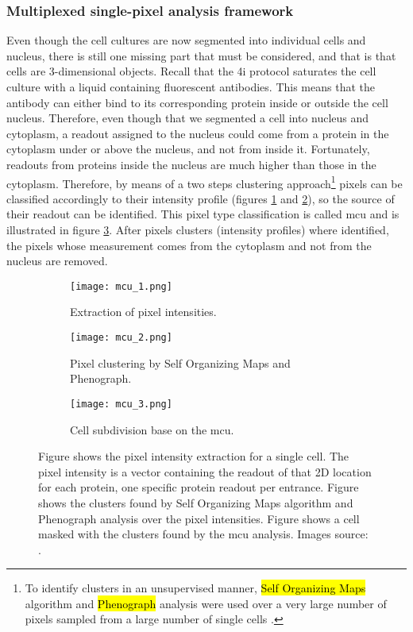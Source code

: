\subsubsection{Multiplexed single-pixel analysis framework}
Even though the cell cultures are now segmented into individual cells and nucleus, there is still one missing part that must be considered, and that is that cells are 3-dimensional objects. Recall that the \gls{4i} protocol saturates the cell culture with a liquid containing fluorescent antibodies. This means that the antibody can either bind to its corresponding protein inside or outside the cell nucleus. Therefore, even though that we segmented a cell into nucleus and cytoplasm, a readout assigned to the nucleus could come from a protein in the cytoplasm under or above the nucleus, and not from inside it. Fortunately, readouts from proteins inside the nucleus are much higher than those in the cytoplasm. Therefore, by means of a two steps clustering approach\footnote{To identify clusters in an unsupervised manner, \hl{Self Organizing Maps} algorithm and \hl{Phenograph} analysis were used over a very large number of pixels sampled from a large number of single cells \cite{Guteaar7042}.} pixels can be classified accordingly to their intensity profile (figures \ref{fig:mcu:1} and \ref{fig:mcu:2}), so the source of their readout can be identified. This pixel type classification is called \Acrfull{mcu} and is illustrated in figure \ref{fig:mcu:3}. After pixels clusters (intensity profiles) where identified, the pixels whose measurement comes from the cytoplasm and not from the nucleus are removed.

\begin{figure}[htb]
  \centering
  \begin{subfigure}[t]{.3\linewidth}
    \texttt{[image: mcu\_1.png]}
    \caption{Extraction of pixel intensities.}
    \label{fig:mcu:1}
  \end{subfigure}
  \hspace{4mm}
  \begin{subfigure}[t]{.3\linewidth}
    \texttt{[image: mcu\_2.png]}
    \caption{Pixel clustering by Self Organizing Maps and Phenograph.}
    \label{fig:mcu:2}
  \end{subfigure}
  \hspace{4mm}
  \begin{subfigure}[t]{.3\linewidth}
    \texttt{[image: mcu\_3.png]}
    \caption{Cell subdivision base on the \gls{mcu}.}
    \label{fig:mcu:3}
  \end{subfigure}
  \caption{Figure  shows the pixel intensity extraction for a single cell. The pixel intensity is a vector containing the readout of that 2D location for each protein, one specific protein readout per entrance. Figure  shows the clusters found by Self Organizing Maps algorithm and Phenograph analysis over the pixel intensities. Figure  shows a cell masked with the clusters found by the \gls{mcu} analysis. Images source: \cite{Guteaar7042}.}
  \label{fig:mcu}
\end{figure}

